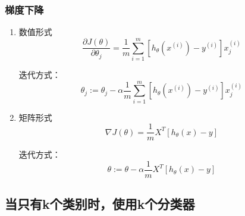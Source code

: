 \subsubsection{梯度下降}
\begin{enumerate}
\item 数值形式
\begin{equation}
	\frac{\partial J(\theta)}{\partial \theta_j} =
	    \frac{1}{m} \sum_{i=1}^m \left[h_\theta(x^{(i)}) - y^{(i)}\right] x_j^{(i)}
\end{equation}

迭代方式：
\begin{equation}
	\theta_j :=
	    \theta_j - \alpha \frac{1}{m} \sum_{i=1}^m \left[h_\theta(x^{(i)}) - y^{(i)}\right] x_j^{(i)}
\end{equation}

\item 矩阵形式
\begin{equation}
	\nabla J(\theta) = \frac{1}{m} X^T \left[h_\theta(x) - y\right]
\end{equation}

迭代方式：
\begin{equation}
	\theta := \theta - \alpha \frac{1}{m} X^T \left[h_\theta(x) - y\right]
\end{equation}
\end{enumerate}



\subsection{当只有k个类别时，使用k个分类器}
